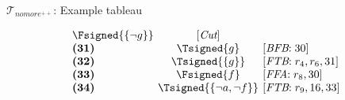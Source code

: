 \begin{frame}{$\mathcal{T}_{\textit{nomore}^{++}}$: Example tableau}
\begin{center}
\begin{minipage}[t]{16cm}
\begin{minipage}[t]{6cm}
\begin{minipage}[t]{2cm}
\[\begin{array}{l@{~~}c@{~~}l}
  \Fsigned{\{\neg g\}}                     &
  [\textit{Cut}]                                   \\
\textbf{(31)}                                      &
  \Tsigned{g}                                      &
  [\textit{BFB}{:}\;\text{30}]                     \\
\textbf{(32)}                                      &
  \Tsigned{\{g\}}                                  &
  [\textit{FTB}{:}\;r_4, r_6, \text{31}]           \\
\textbf{(33)}                                      &
  \Fsigned{f}                                      &
  [\textit{FFA}{:}\;r_8, \text{30}]                \\
\textbf{(34)}                                      & \hspace{-0.1cm}
  \Tsigned{\{\neg a,\neg f\}}      \hspace{-0.1cm} &
  [\textit{FTB}{:}\;r_9, \text{16}, \text{33}]
\end{array}
\]
\end{minipage}
\end{minipage}
\end{minipage}
\end{center}
\end{frame}
